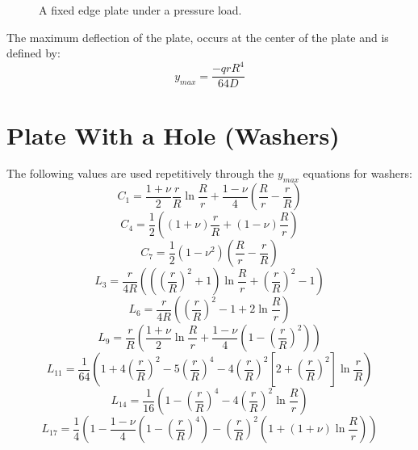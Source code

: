 \documentclass[10pt,letterpaper]{report}
\numberwithin{equation}{chapter}
\begin{document}
\begin{figure}[!ht]
\centering
\label{fig:fpd}
    \hfill
    \caption{A fixed edge plate under a pressure load.}
    \label{fig:dummy}
\end{figure}
The maximum deflection of the plate, occurs at the center of the plate and is defined by:
\[y_{max} = \frac{-q rR^4}{64D}\]


\section{Plate With a Hole (Washers)}
\label{sec: Washer}

The following values are used repetitively through the $y_{max}$ equations for washers:
\[C_1 = \frac{1+\nu}{2}\frac{r}{R} \ln \frac{R}{r}+\frac{1-\nu}{4} \left( \frac{R}{r} - \frac{r}{R}\right)\]
\[C_4 = \frac{1}{2} \left( (1+\nu)\frac{r}{R} + (1-\nu) \frac{R}{r} \right)\]
\[C_7 = \frac{1}{2} (1-\nu^2)\left( \frac{R}{r} - \frac{r}{R}\right)\]
\[L_3 = \frac{r}{4R}\left( \left(\left( \frac{r}{R} \right) ^2 +1 \right) \ln \frac{R}{r} + \left( \frac{r}{R}\right)^2 -1 \right)\]
\[L_6 = \frac{r}{4R}\left( \left( \frac{r}{R} \right) ^2 -1+2 \ln \frac{R}{r}  \right)\]
\[L_9 = \frac{r}{R}\left( \frac{1+\nu}{2} \ln \frac{R}{r}    + \frac{1-\nu}{4}  \left( 1 - \left( \frac{r}{R} \right) ^2  \right) \right)\]
\[L_{11} = \frac{1}{64} \left(1 + 4 \left( \frac{r}{R}\right)^2 -5\left( \frac{r}{R}\right)^4 -4\left( \frac{r}{R}\right)^2\left[ 2 + \left( \frac{r}{R}\right)^2 \right] \ln  \frac{r}{R} \right) \]
\[L_{14} = \frac{1}{16} \left(1 - \left( \frac{r}{R}\right)^4 - 4\left( \frac{r}{R}\right)^2  \ln  \frac{R}{r}  \right)\]
\[L_{17} =\frac{1}{4} \left( 1 - \frac{1-\nu}{4} \left( 1 - \left( \frac{r}{R} \right) ^4 \right) - \left( \frac{r}{R} \right) ^2 \left( 1 + (1 + \nu ) \ln \frac{R}{r} \right) \right) \]
\end{document}
